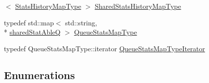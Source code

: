 \begin{DoxyCompactItemize}
$<$ \hyperlink{a00089_a8dbb864ea5d1e1fae0d3a1435bd295e7}{Stats\-History\-Map\-Type} $>$ \hyperlink{a00089_afa626c76d3dca5d5e1be4146f211fefa}{Shared\-Stats\-History\-Map\-Type}
\item 
typedef std\-::map$<$ std\-::string, \\*
\hyperlink{a00089_a141592ccd82280d2692ca3b9b490faab}{shared\-Stat\-Able\-Q} $>$ \hyperlink{a00089_a36c7aee4be6fad3cc8ab5ec896e1f9a5}{Queue\-Stats\-Map\-Type}
\item 
typedef Queue\-Stats\-Map\-Type\-::iterator \hyperlink{a00089_a108455a00c9a8ea1f3416c5cab767bbe}{Queue\-Stats\-Map\-Type\-Iterator}
\end{DoxyCompactItemize}
\subsection*{Enumerations}
